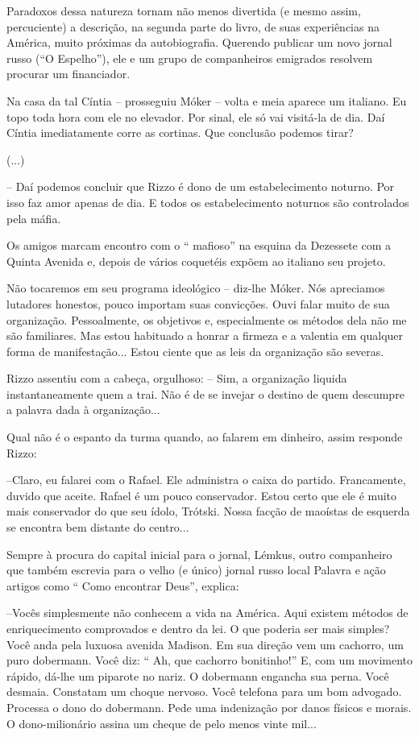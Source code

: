 Paradoxos dessa natureza tornam  não menos divertida (e mesmo assim, percuciente) a descrição, na segunda parte do livro, de suas experiências na América, muito próximas da autobiografia. Querendo publicar um novo jornal russo (``O Espelho''), ele e um grupo de companheiros emigrados resolvem procurar um financiador.

Na casa da tal Cíntia – prosseguiu Móker – volta e meia aparece um italiano. Eu topo toda hora com ele no elevador. Por sinal, ele só vai visitá-la de dia. Daí Cíntia imediatamente corre as cortinas. Que conclusão podemos tirar?

(...)

-- Daí podemos concluir que Rizzo é dono de um estabelecimento noturno. Por isso faz amor apenas de dia. E todos os estabelecimento noturnos são controlados pela máfia.

Os amigos marcam encontro com o “ mafioso” na esquina da Dezessete com a Quinta Avenida e, depois de vários coquetéis expõem ao italiano seu projeto.

Não tocaremos em seu programa ideológico – diz-lhe Móker. Nós apreciamos lutadores honestos, pouco importam suas convicções. Ouvi falar muito de sua organização. Pessoalmente, os objetivos e, especialmente os métodos dela não me são familiares. Mas estou habituado a honrar a firmeza e a valentia em qualquer forma de manifestação... Estou ciente que as leis da organização são severas.

Rizzo assentiu com a cabeça, orgulhoso: -- Sim, a organização liquida instantaneamente quem a trai. Não é de se invejar o destino de quem descumpre a palavra dada à organização...

Qual não é o espanto da turma quando, ao falarem em dinheiro, assim responde Rizzo:

--Claro, eu falarei com o Rafael. Ele administra o caixa do partido. Francamente, duvido que aceite. Rafael é um pouco conservador. Estou certo que ele é muito mais conservador do que seu ídolo, Trótski. Nossa facção de maoístas de esquerda se encontra bem distante do centro...

Sempre à procura do capital inicial para o jornal, Lémkus, outro companheiro que também escrevia para o velho (e único) jornal russo local Palavra e ação artigos como “ Como encontrar Deus”, explica:

--Vocês simplesmente não conhecem a vida na América. Aqui existem métodos de enriquecimento comprovados e dentro da lei. O que poderia ser mais simples? Você anda pela luxuosa avenida Madison. Em sua direção vem um cachorro, um puro dobermann. Você diz: “ Ah, que cachorro bonitinho!” E, com um movimento rápido, dá-lhe um piparote no nariz. O dobermann engancha sua perna. Você desmaia. Constatam um choque nervoso. Você telefona para um bom advogado. Processa o dono do dobermann. Pede uma indenização por danos físicos e morais. O dono-milionário assina um cheque de pelo menos vinte mil...

